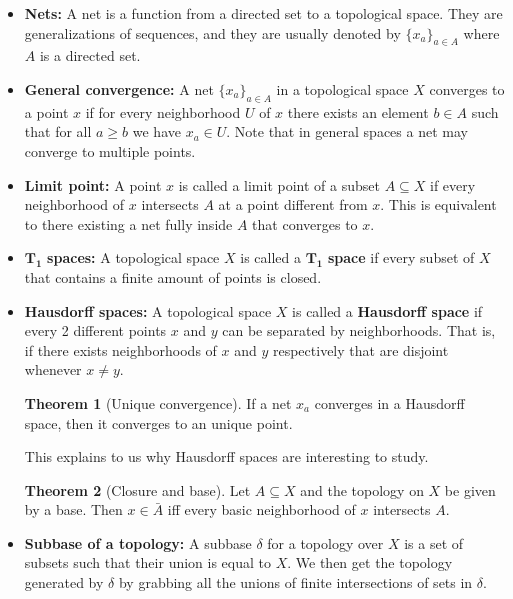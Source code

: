 \documentclass[a4paper]{book}
\theoremstyle{definition}
\newtheorem{theorem}{Theorem}[section]
\theoremstyle{ejemplo}
\theoremstyle{demostracion}
\begin{document}
\begin{itemize}

\item
\textbf{Nets: }A net is a function from a directed set to a topological space. They are generalizations of sequences, and they are usually denoted by $\{x_{a}\}_{a\in A}$ where $A$ is a directed set.

\item
\textbf{General convergence: }A net $\{x_{a}\}_{a\in A}$  in a topological space $X$ converges to a point $x$ if for every neighborhood $U$ of $x$ there exists an element $b\in A$ such that for all $a\geq b$ we have $x_{a}\in U$. Note that in general spaces a net may converge to multiple points.

\item
\textbf{Limit point: }A point $x$ is called a limit point of a subset $A\subseteq X$ if every neighborhood of $x$ intersects $A$ at a point different from $x$. This is equivalent to there existing a net fully inside $A$ that converges to $x$.

\item
$\boldsymbol{T_{1}}$\textbf{ spaces: }A topological space $X$ is called a $\boldsymbol{T_{1}}$\textbf{ space} if every subset of $X$ that contains a finite amount of points is closed.

\item
\textbf{Hausdorff spaces: }A topological space $X$ is called a \textbf{Hausdorff space} if every 2 different points $x$ and $y$ can be separated by neighborhoods. That is, if there exists neighborhoods of $x$ and $y$ respectively that are disjoint whenever $x\neq y$.

\begin{theorem}[Unique convergence]
If a net $x_{a}$ converges in a Hausdorff space, then it converges to an unique point.
\end{theorem}
This explains to us why Hausdorff spaces are interesting to study.


\begin{theorem}[Closure and base]
Let $A\subseteq X$ and the topology on $X$ be given by a base. Then $x\in\bar{A}$ iff every basic neighborhood of $x$ intersects $A$.
\end{theorem}

\item
\textbf{Subbase of a topology: }A subbase $\delta$ for a topology over $X$ is a set of subsets such that their union is equal to $X$. We then get the topology generated by $\delta$ by grabbing all the unions of finite intersections of sets in $\delta$.


\end{itemize}
\end{document}
